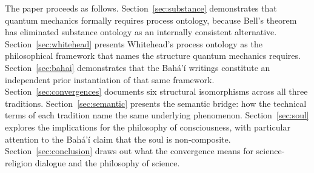 The paper proceeds as follows.
Section~\ref{sec:substance} demonstrates that quantum mechanics formally
requires process ontology, because Bell's theorem has eliminated
substance ontology as an internally consistent alternative.
Section~\ref{sec:whitehead} presents Whitehead's process ontology as the
philosophical framework that names the structure quantum mechanics requires.
Section~\ref{sec:bahai} demonstrates that the Bahá'í writings constitute
an independent prior instantiation of that same framework.
Section~\ref{sec:convergences} documents six structural isomorphisms across
all three traditions.
Section~\ref{sec:semantic} presents the semantic bridge: how the technical
terms of each tradition name the same underlying phenomenon.
Section~\ref{sec:soul} explores the implications for the philosophy of
consciousness, with particular attention to the Bahá'í claim that the
soul is non-composite.
Section~\ref{sec:conclusion} draws out what the convergence means for
science-religion dialogue and the philosophy of science.
